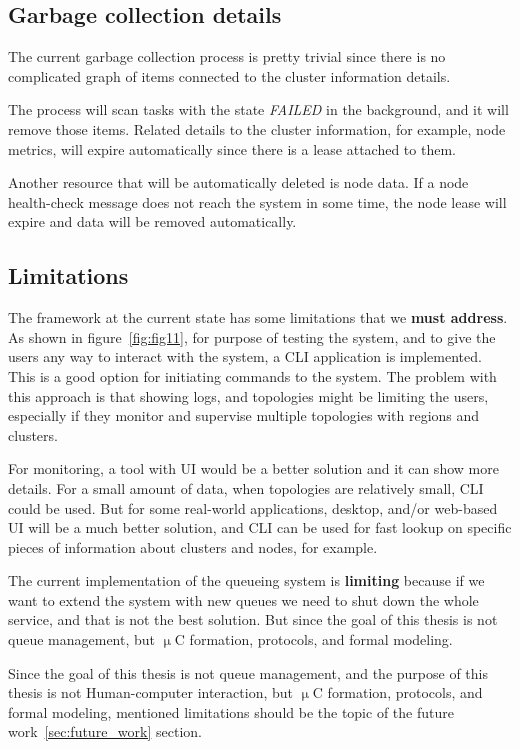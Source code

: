 \subsection{Garbage collection details}\label{sec:gc}
%
The current garbage collection process is pretty trivial since there is no complicated graph of items connected to the cluster information details.

The process will scan tasks with the state \emph{FAILED} in the background, and it will remove those items. Related details to the cluster information, for example, node metrics, will expire automatically since there is a lease attached to them.

Another resource that will be automatically deleted is node data. If a node health-check message does not reach the system in some time, the node lease will expire and data will be removed automatically.
%
%
\subsection{Limitations}\label{sec:framework_limits}
% 
The framework at the current state has some limitations that we \textbf{must address}. As shown in figure~\ref{fig:fig11}, for purpose of testing the system, and to give the users any way to interact with the system, a CLI application is implemented. This is a good option for initiating commands to the system. The problem with this approach is that showing logs, and topologies might be limiting the users, especially if they monitor and supervise multiple topologies with regions and clusters.

For monitoring, a tool with UI would be a better solution and it can show more details. For a small amount of data, when topologies are relatively small, CLI could be used. But for some real-world applications, desktop, and/or web-based UI will be a much better solution, and CLI can be used for fast lookup on specific pieces of information about clusters and nodes, for example.

The current implementation of the queueing system is \textbf{limiting} because if we want to extend the system with new queues we need to shut down the whole service, and that is not the best solution. But since the goal of this thesis is not queue management, but $\upmu$C formation, protocols, and formal modeling.

Since the goal of this thesis is not queue management, and the purpose of this thesis is not Human-computer interaction, but $\upmu$C formation, protocols, and formal modeling, mentioned limitations should be the topic of the future work~\ref{sec:future_work} section.

